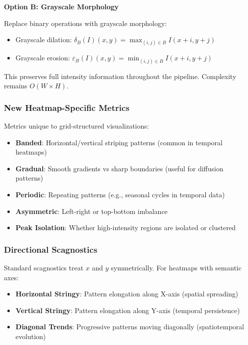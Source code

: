 \documentclass[11pt]{article}
\begin{document}
\textbf{Option B: Grayscale Morphology}

Replace binary operations with grayscale morphology:
\begin{itemize}
    \item Grayscale dilation: $\delta_B(I)(x,y) = \max_{(i,j) \in B} I(x+i, y+j)$
    \item Grayscale erosion: $\varepsilon_B(I)(x,y) = \min_{(i,j) \in B} I(x+i, y+j)$
\end{itemize}

This preserves full intensity information throughout the pipeline. Complexity remains $O(W \times H)$.

\subsubsection{New Heatmap-Specific Metrics}

Metrics unique to grid-structured visualizations:
\begin{itemize}
    \item \textbf{Banded}: Horizontal/vertical striping patterns (common in temporal heatmaps)
    \item \textbf{Gradual}: Smooth gradients vs sharp boundaries (useful for diffusion patterns)
    \item \textbf{Periodic}: Repeating patterns (e.g., seasonal cycles in temporal data)
    \item \textbf{Asymmetric}: Left-right or top-bottom imbalance
    \item \textbf{Peak Isolation}: Whether high-intensity regions are isolated or clustered
\end{itemize}

\subsubsection{Directional Scagnostics}

Standard scagnostics treat $x$ and $y$ symmetrically. For heatmaps with semantic axes:
\begin{itemize}
    \item \textbf{Horizontal Stringy}: Pattern elongation along X-axis (spatial spreading)
    \item \textbf{Vertical Stringy}: Pattern elongation along Y-axis (temporal persistence)
    \item \textbf{Diagonal Trends}: Progressive patterns moving diagonally (spatiotemporal evolution)
\end{itemize}
\end{document}
